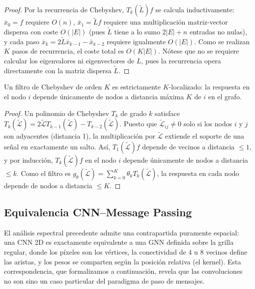 \begin{proof}
Por la recurrencia de Chebyshev, $T_k(\tilde{L})f$ se calcula inductivamente: $\bar{x}_0 = f$ requiere $O(n)$, $\bar{x}_1 = \tilde{L}f$ requiere una multiplicación matriz-vector dispersa con coste $O(|E|)$ (pues $\tilde{L}$ tiene a lo sumo $2|E| + n$ entradas no nulas), y cada paso $\bar{x}_k = 2\tilde{L}\bar{x}_{k-1} - \bar{x}_{k-2}$ requiere igualmente $O(|E|)$. Como se realizan $K$ pasos de recurrencia, el coste total es $O(K|E|)$. Nótese que no se requiere calcular los eigenvalores ni eigenvectores de $L$, pues la recurrencia opera directamente con la matriz dispersa $\tilde{L}$.
\end{proof}

\begin{theorem}\label{thm:localizacion_chebyshev}
Un filtro de Chebyshev de orden $K$ es estrictamente $K$-localizado: la respuesta en el nodo $i$ depende únicamente de nodos a distancia máxima $K$ de $i$ en el grafo.
\end{theorem}

\begin{proof}
Un polinomio de Chebyshev $T_k$ de grado $k$ satisface $T_k(\tilde{\mathcal{L}}) = 2\tilde{\mathcal{L}} T_{k-1}(\tilde{\mathcal{L}}) - T_{k-2}(\tilde{\mathcal{L}})$. Puesto que $\tilde{\mathcal{L}}_{ij} \neq 0$ solo si los nodos $i$ y $j$ son adyacentes (distancia 1), la multiplicación por $\tilde{\mathcal{L}}$ extiende el soporte de una señal en exactamente un salto. Así, $T_1(\tilde{\mathcal{L}})f$ depende de vecinos a distancia $\leq 1$, y por inducción, $T_k(\tilde{\mathcal{L}})f$ en el nodo $i$ depende únicamente de nodos a distancia $\leq k$. Como el filtro es $g_\theta(\tilde{\mathcal{L}}) = \sum_{k=0}^K \theta_k T_k(\tilde{\mathcal{L}})$, la respuesta en cada nodo depende de nodos a distancia $\leq K$.
\end{proof}

\subsection{Equivalencia CNN--Message Passing}\label{subsec:equivalencia_conv_mp}\label{sec:cnn_as_gnn}

El análisis espectral precedente admite una contrapartida puramente espacial: una \gls{CNN} 2D es exactamente equivalente a una \gls{GNN} definida sobre la grilla regular, donde los píxeles son los vértices, la conectividad de 4 u 8 vecinos define las aristas, y los pesos se comparten según la posición relativa (el kernel). Esta correspondencia, que formalizamos a continuación, revela que las convoluciones no son sino un caso particular del paradigma de paso de mensajes.

